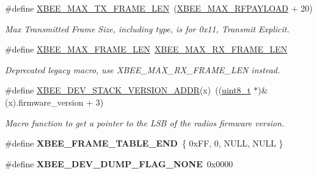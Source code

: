 \begin{DoxyCompactItemize}
\#define \hyperlink{group__xbee__device_gac074767d8df0749a2992bf5b292f9b54}{X\+B\+E\+E\+\_\+\+M\+A\+X\+\_\+\+T\+X\+\_\+\+F\+R\+A\+M\+E\+\_\+\+L\+EN}~(\hyperlink{group__xbee__device_gaea0dcde46961aae6f1cf5949be02d1a6}{X\+B\+E\+E\+\_\+\+M\+A\+X\+\_\+\+R\+F\+P\+A\+Y\+L\+O\+AD} + 20)
\begin{DoxyCompactList}\small\item\em Max Transmitted Frame Size, including type, is for 0x11, Transmit Explicit. \end{DoxyCompactList}\item 
\mbox{\label{group__xbee__device_gad842f3c5f8d2264a99ab67a01054323a}} 
\#define \hyperlink{group__xbee__device_gad842f3c5f8d2264a99ab67a01054323a}{X\+B\+E\+E\+\_\+\+M\+A\+X\+\_\+\+F\+R\+A\+M\+E\+\_\+\+L\+EN}~\hyperlink{group__xbee__device_gaefbbf0c7c5b7560f7137e5ff2cab4e45}{X\+B\+E\+E\+\_\+\+M\+A\+X\+\_\+\+R\+X\+\_\+\+F\+R\+A\+M\+E\+\_\+\+L\+EN}
\begin{DoxyCompactList}\small\item\em Deprecated legacy macro, use X\+B\+E\+E\+\_\+\+M\+A\+X\+\_\+\+R\+X\+\_\+\+F\+R\+A\+M\+E\+\_\+\+L\+EN instead. \end{DoxyCompactList}\item 
\#define \hyperlink{group__xbee__device_ga3379d057739746b5365e74c53a5b11e9}{X\+B\+E\+E\+\_\+\+D\+E\+V\+\_\+\+S\+T\+A\+C\+K\+\_\+\+V\+E\+R\+S\+I\+O\+N\+\_\+\+A\+D\+DR}(x)~((\hyperlink{group__hal__dos_gae1affc9ca37cfb624959c866a73f83c2}{uint8\+\_\+t} $\ast$)\&(x).firmware\+\_\+version + 3)
\begin{DoxyCompactList}\small\item\em Macro function to get a pointer to the L\+SB of the radio\textquotesingle{}s firmware version. \end{DoxyCompactList}\item 
\mbox{\label{group__xbee__device_gac81604781dcb36ca33af03ec44a6077a}} 
\#define {\bfseries X\+B\+E\+E\+\_\+\+F\+R\+A\+M\+E\+\_\+\+T\+A\+B\+L\+E\+\_\+\+E\+ND}~\{ 0x\+F\+F, 0, N\+U\+L\+L, N\+U\+L\+L \}
\item 
\mbox{\label{group__xbee__device_ga3ac470bd616105be9ab7de9265c2b43b}} 
\#define {\bfseries X\+B\+E\+E\+\_\+\+D\+E\+V\+\_\+\+D\+U\+M\+P\+\_\+\+F\+L\+A\+G\+\_\+\+N\+O\+NE}~0x0000
\item 
\mbox{\label{group__xbee__device_ga00403b13f32a981d18df79f31504b90a}} 

\end{DoxyCompactItemize}
